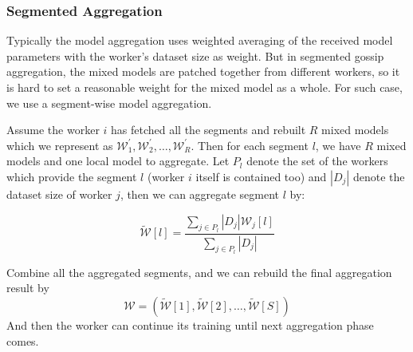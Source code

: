 \subsubsection{Segmented Aggregation}
Typically the model aggregation uses weighted averaging of the received model parameters with the worker's dataset size as weight. But in segmented gossip aggregation, the mixed models are patched together from different workers, so it is hard to set a reasonable weight for the mixed model as a whole. For such case, we use a segment-wise model aggregation. 

 Assume the worker $i$ has fetched all the segments and rebuilt $R$ mixed models which we represent as $\mathcal{W}^\prime_1,\mathcal{W}^\prime_2, \dots ,\mathcal{W}^\prime_R$. Then for each segment $l$, we have $R$ mixed models and one local model to aggregate. Let $P_l$ denote the set of the workers which provide the segment $l$ (worker $i$ itself is contained too) and $|D_j|$ denote the dataset size of worker $j$, then we can aggregate segment $l$ by:
 
 \begin{equation}
 \label{eq:seg_agg}
     \widetilde{\mathcal{W}}[l] = \frac{\sum_{j\in P_l}|D_j|\mathcal{W}_j[l]}{\sum_{j\in P_l}|D_j|}
 \end{equation}

Combine all the aggregated segments, and we can rebuild the final aggregation result by 
\begin{equation}
    \mathcal{W} = (\widetilde{\mathcal{W}}[1],\widetilde{\mathcal{W}}[2],\dots,\widetilde{\mathcal{W}}[S])
\end{equation}
And then the worker can continue its training until next aggregation phase comes.
